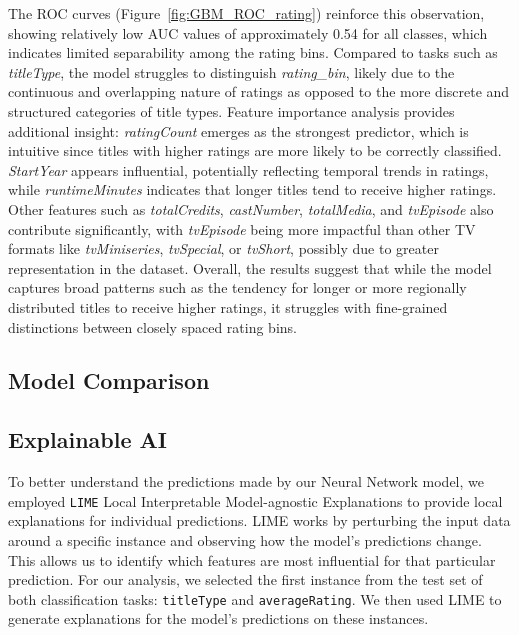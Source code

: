 The ROC curves (Figure~\ref{fig:GBM_ROC_rating}) reinforce this observation, 
showing relatively low AUC values of approximately 0.54 for all classes, which indicates limited 
separability among the rating bins. Compared to tasks such as \textit{titleType}, the model struggles to distinguish \textit{rating\_bin}, 
likely due to the continuous and overlapping nature of ratings as opposed to the more discrete and structured categories of title types. 
Feature importance analysis provides additional insight: \textit{ratingCount} emerges as the strongest predictor, 
which is intuitive since titles with higher ratings are more likely to be correctly classified. 
\textit{StartYear} appears influential, potentially reflecting temporal trends in ratings, 
while \textit{runtimeMinutes} indicates that longer titles tend to receive higher ratings. 
Other features such as \textit{totalCredits}, \textit{castNumber}, \textit{totalMedia}, and \textit{tvEpisode} also contribute significantly, 
with \textit{tvEpisode} being more impactful than other TV formats like \textit{tvMiniseries}, \textit{tvSpecial}, or \textit{tvShort}, 
possibly due to greater representation in the dataset.
Overall, the results suggest that while the model captures broad patterns such as the tendency for longer or more regionally distributed titles to receive higher ratings, 
it struggles with fine-grained distinctions between closely spaced rating bins. 



\subsection{Model Comparison}

\subsection{Explainable AI}
To better understand the predictions made by our Neural Network model, we employed \texttt{LIME} Local Interpretable Model-agnostic Explanations 
to provide local explanations for individual predictions.
LIME works by perturbing the input data around a specific instance and 
observing how the model's predictions change. 
This allows us to identify which features are most influential for that particular prediction.
For our analysis, we selected the first instance from the test set of both classification tasks: \texttt{titleType} and \texttt{averageRating}.
We then used LIME to generate explanations for the model's predictions on these instances.

